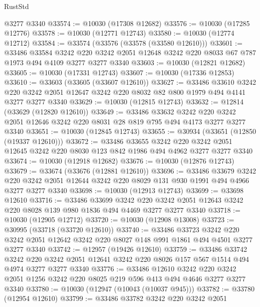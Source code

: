 \begin{lexlean}{RustStd}
\begin{coremodule}
    @3277
    @3340
@33574 := @10030 (@17308 @12682)
@33576 := @10030 (@17285 @12776)
@33578 := @10030 (@12771 @12743)
@33580 := @10030 (@12774 @12712)
@33584 := @33574 (@33576 (@33578 (@33580 @12610)))
@33601 := @33486
    @33584
    @3242
    @220
    @3242
    @2051
    @12648
    @3242
    @220
    @8033
    @67
    @787
    @1973
    @494
    @4109
    @3277
    @3277
    @3340
@33603 := @10030 (@12821 @12682)
@33605 := @10030 (@17331 @12743)
@33607 := @10030 (@17336 @12853)
@33610 := @33603 (@33605 (@33607 @12610))
@33627 := @33486
    @33610
    @3242
    @220
    @3242
    @2051
    @12647
    @3242
    @220
    @8032
    @82
    @800
    @1979
    @494
    @4141
    @3277
    @3277
    @3340
@33629 := @10030 (@12815 @12743)
@33632 := @12814 (@33629 (@12820 @12610))
@33649 := @33486
    @33632
    @3242
    @220
    @3242
    @2051
    @12646
    @3242
    @220
    @8031
    @28
    @819
    @795
    @494
    @4173
    @3277
    @3277
    @3340
@33651 := @10030 (@12845 @12743)
@33655 := @30934 (@33651 (@12850 (@19337 @12610)))
@33672 := @33486
    @33655
    @3242
    @220
    @3242
    @2051
    @12645
    @3242
    @220
    @8030
    @123
    @842
    @1986
    @494
    @4962
    @3277
    @3277
    @3340
@33674 := @10030 (@12918 @12682)
@33676 := @10030 (@12876 @12743)
@33679 := @33674 (@33676 (@12881 @12610))
@33696 := @33486
    @33679
    @3242
    @220
    @3242
    @2051
    @12644
    @3242
    @220
    @8029
    @131
    @930
    @1991
    @494
    @4966
    @3277
    @3277
    @3340
@33698 := @10030 (@12913 @12743)
@33699 := @33698 @12610
@33716 := @33486
    @33699
    @3242
    @220
    @3242
    @2051
    @12643
    @3242
    @220
    @8028
    @139
    @980
    @1836
    @494
    @4469
    @3277
    @3277
    @3340
@33718 := @10030 (@12905 @12712)
@33720 := @10030 (@12908 @13008)
@33723 := @30995 (@33718 (@33720 @12610))
@33740 := @33486
    @33723
    @3242
    @220
    @3242
    @2051
    @12642
    @3242
    @220
    @8027
    @148
    @991
    @1861
    @494
    @4501
    @3277
    @3277
    @3340
@33742 := @12957 (@19426 @12610)
@33759 := @33486
    @33742
    @3242
    @220
    @3242
    @2051
    @12641
    @3242
    @220
    @8026
    @157
    @567
    @1514
    @494
    @4974
    @3277
    @3277
    @3340
@33776 := @33486
    @12610
    @3242
    @220
    @3242
    @2051
    @1256
    @3242
    @220
    @8025
    @219
    @596
    @413
    @494
    @4646
    @3277
    @3277
    @3340
@33780 := @10030 (@12947 (@10043 (@10037 @945)))
@33782 := @33780 (@12954 @12610)
@33799 := @33486
    @33782
    @3242
    @220
    @3242
    @2051

\end{coremodule}
\end{lexlean}
